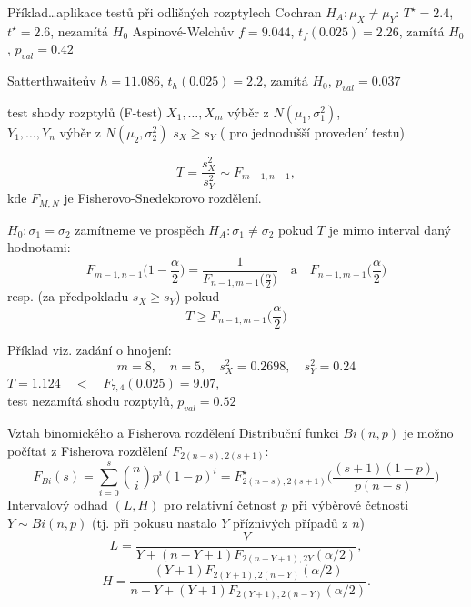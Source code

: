 \documentclass[smaller]{beamer}
\def\xskip{{\vspace{2ex}}}
\begin{document}
\begin{frame}{Příklad\dots aplikace testů  při odlišných rozptylech}
Cochran $H_A:  \mu_X\ne \mu_Y$:
$T^{\star} = 2.4$, $t^{\star} = 2.6$, nezamítá $H_0$
\xskip
Aspinové-Welchův $f=9.044$, $t_f(0.025) = 2.26$, zamítá $H_0$, $p_{val} = 0.42$

\xskip
Satterthwaiteův $h=11.086$, $t_h(0.025) =2.2$, zamítá $H_0$, $p_{val} = 0.037 $

\end{frame}




\begin{frame}{test shody rozptylů (F-test)}
$X_1, \dots ,X_m$ výběr z $N(\mu_1,\sigma_1^2)$,\\
$Y_1, \dots ,Y_n$ výběr z $N(\mu_2,\sigma_2^2)$
$s_X \ge s_Y$ ( pro jednodušší provedení testu)

\[
  T=\frac{s_X^2}{s_Y^2} \sim F_{m-1,n-1},
\]
kde $F_{M,N}$ je Fisherovo-Snedekorovo rozdělení.

$H_0:\sigma_1 = \sigma_2$ zamítneme ve prospěch $H_A: \sigma_1\ne\sigma_2$ pokud $T$ je mimo interval
daný hodnotami:
\[
 F_{m-1,n-1}\Big(1-\frac{\alpha}{2}\Big) = \frac{1}{F_{n-1,m-1}\big(\frac{\alpha}{2}\big)}
 \quad\text{a}\quad
 F_{n-1,m-1}\Big(\frac{\alpha}{2}\Big)
\]
resp. (za předpokladu $s_X \ge s_Y$) pokud
\[
  T \ge F_{n-1,m-1}\Big(\frac{\alpha}{2}\Big)
\]
\end{frame}

\begin{frame}{Příklad}
viz. zadání o hnojení: 
\[
 m=8,\quad n=5,\quad s_X^2=0.2698,\quad s_Y^2=0.24
\]
$T = 1.124\quad <\quad F_{7,4}(0.025) = 9.07$,\\
test nezamítá shodu rozptylů, $p_{val}=0.52$
 
\end{frame}

\begin{frame}{Vztah binomického a Fisherova rozdělení}
Distribuční funkci $Bi(n,p)$ je možno počítat z Fisherova rozdělení $F_{2(n-s),2(s+1)}$:
\[
 F_{Bi}(s) = \sum_{i=0}^s \binom{n}{i} p^i (1-p)^i = F^\star_{2(n-s),2(s+1)}\Big(\frac{(s+1)(1-p)}{p(n-s)}\Big) 
\]
Intervalový odhad $(L,H)$ pro relativní četnost $p$ při výběrové četnosti $Y\sim Bi(n,p)$ (tj. při pokusu nastalo $Y$ příznivých případů z $n$)
\[
 L = \frac{Y}{Y +(n-Y+1)F_{2(n-Y+1),2Y}(\alpha / 2)},
\]
\[
 H = \frac{(Y+1)F_{2(Y+1),2(n-Y)}(\alpha / 2)}{n-Y +(Y+1)F_{2(Y+1),2(n-Y)}(\alpha / 2)}.
\]

\end{frame}
\end{document}
